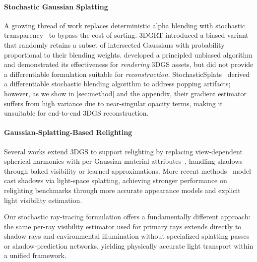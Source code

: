\paragraph{Stochastic Gaussian Splatting}
A growing thread of work replaces deterministic alpha blending with stochastic transparency~\cite{Enderton2010} to bypass the cost of sorting. 3DGRT introduced a biased variant that randomly retains a subset of intersected Gaussians with probability proportional to their blending weights. \citet{Sun2025} developed a principled unbiased algorithm and demonstrated its effectiveness for \emph{rendering} 3DGS assets, but did not provide a differentiable formulation suitable for \emph{reconstruction}. StochasticSplats~\cite{kv2025stochasticsplats} derived a differentiable stochastic blending algorithm to address popping artifacts; however, as we show in \autoref{sec:method} and the appendix, their gradient estimator suffers from high variance due to near-singular opacity terms, making it unsuitable for end-to-end 3DGS reconstruction.

\paragraph{Gaussian-Splatting-Based Relighting}
Several works extend 3DGS to support relighting by replacing view-dependent spherical harmonics with per-Gaussian material attributes~\cite{R3DG2023, liang2023gs, SVG-IR, gu2024IRGS}, handling shadows through baked visibility or learned approximations. More recent methods~\cite{bi2024rgs, RNG} model cast shadows via light-space splatting, achieving stronger performance on relighting benchmarks through more accurate appearance models and explicit light visibility estimation.

Our stochastic ray-tracing formulation offers a fundamentally different approach: the same per-ray visibility estimator used for primary rays extends directly to shadow rays and environmental illumination without specialized splatting passes or shadow-prediction networks, yielding physically accurate light transport within a unified framework.
